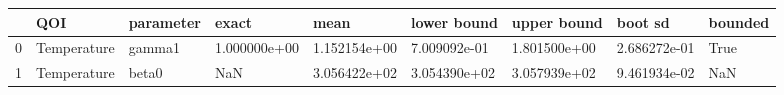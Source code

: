 \begin{tabular}{lllllllll}
\toprule
{} &          QOI & parameter &        exact &         mean &  lower bound &  upper bound &      boot sd & bounded \\
\midrule
0 &  Temperature &    gamma1 & 1.000000e+00 & 1.152154e+00 & 7.009092e-01 & 1.801500e+00 & 2.686272e-01 &    True \\
1 &  Temperature &     beta0 &          NaN & 3.056422e+02 & 3.054390e+02 & 3.057939e+02 & 9.461934e-02 &     NaN \\
\bottomrule
\end{tabular}
